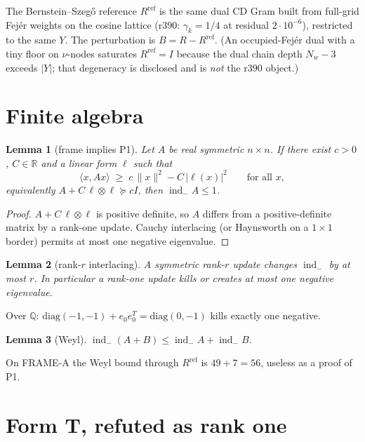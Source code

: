 \documentclass[11pt]{article}
\newtheorem{lemma}{Lemma}
\theoremstyle{remark}
\newcommand{\R}{\mathbb{R}}
\newcommand{\indm}{\operatorname{ind}_{-}}
\begin{document}
The Bernstein--Szeg\H{o} reference $R^{\mathrm{ref}}$ is the
same dual CD Gram built from full-grid Fej\'er weights on the
cosine lattice (r390: $\gamma_k=1/4$ at residual $2\cdot 10^{-6}$),
restricted to the same $Y$.
The perturbation is $B=R-R^{\mathrm{ref}}$.
(An occupied-Fej\'er dual with a tiny floor on $\nu$-nodes
saturates $R^{\mathrm{ref}}=I$ because the dual chain depth
$N_w-3$ exceeds $|Y|$; that degeneracy is disclosed and is
\emph{not} the r390 object.)

\section{Finite algebra}\label{sec:alg}

\begin{lemma}[frame implies P1]\label{lem:frame}
Let $A$ be real symmetric $n\times n$.
If there exist $c>0$, $C\in\R$ and a linear form $\ell$ such that
\[
\langle x,Ax\rangle
\;\ge\;
c\,\|x\|^2-C\,|\ell(x)|^2
\qquad\text{for all }x,
\]
equivalently $A+C\,\ell\otimes\ell\succeq c I$, then $\indm A\le 1$.
\end{lemma}

\begin{proof}
$A+C\,\ell\otimes\ell$ is positive definite, so $A$ differs
from a positive-definite matrix by a rank-one update.
Cauchy interlacing (or Haynsworth on a $1\times 1$ border)
permits at most one negative eigenvalue.
\end{proof}

\begin{lemma}[rank-$r$ interlacing]\label{lem:interlace}
A symmetric rank-$r$ update changes $\indm$ by at most $r$.
In particular a rank-one update kills or creates at most one
negative eigenvalue.
\end{lemma}

Over $\mathbb{Q}$: $\mathrm{diag}(-1,-1)+e_0 e_0^T=\mathrm{diag}(0,-1)$
kills exactly one negative.

\begin{lemma}[Weyl]\label{lem:weyl}
$\indm(A+B)\le\indm A+\indm B$.
\end{lemma}

On FRAME-A the Weyl bound through $R^{\mathrm{ref}}$ is $49+7=56$,
useless as a proof of P1.

\section{Form T, refuted as rank one}\label{sec:T}
\end{document}
